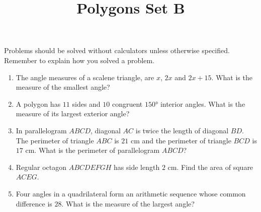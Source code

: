 \documentclass{article}
\title{Polygons Set B}
\author{}
\date{}
\begin{document}
\maketitle
\noindent Problems should be solved without calculators unless otherwise specified.
Remember to explain how you solved a problem.
\begin{multicols}{2}
    \begin{enumerate}
        \item The angle measures of a scalene triangle, are $x$, $2x$ and $2x + 15$.
            What is the measure of the smallest angle?
            \vspace{3cm}
        \item A polygon has $11$ sides and $10$ congruent $\ang{150}$ interior angles.
            What is the measure of its largest exterior angle?
            \vspace{3cm}
        \item In parallelogram $ABCD$, diagonal $AC$ is twice the length of diagonal $BD$.
            The perimeter of triangle $ABC$ is $21$ cm and the perimeter of triangle $BCD$ is $17$ cm.
            What is the perimeter of parallelogram $ABCD$?
            \vspace{3cm}
        \item Regular octagon $ABCDEFGH$ has side length $2$ cm.
            Find the area of square $ACEG$.
            \vspace{3cm}
        \item Four angles in a quadrilateral form an arithmetic sequence whose common difference is $28$.
            What is the measure of the largest angle?
            \vspace{3cm}
    \end{enumerate}
\end{multicols}
\end{document}
